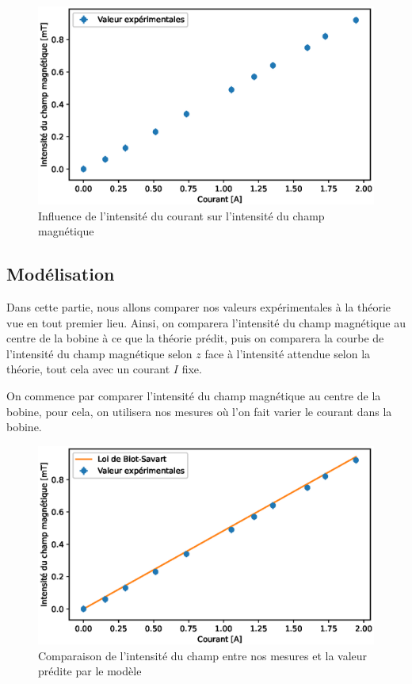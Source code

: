 \documentclass[12pt]{article}
\begin{document}
\begin{figure}[h!]
    \begin{center}
        \includegraphics[scale=0.6]{img/MagnEnFonctionDeI.eps}
    \end{center}
    \caption{Influence de l'intensité du courant sur l'intensité du champ magnétique}
\end{figure}

\newpage

\subsection{Modélisation}
Dans cette partie, nous allons comparer nos valeurs expérimentales à la théorie vue en tout premier lieu. Ainsi,
on comparera l'intensité du champ magnétique au centre de la bobine à ce que la théorie prédit, puis on comparera la courbe
de l'intensité du champ magnétique selon $z$ face à l'intensité attendue selon la théorie, tout cela avec un courant $I$ fixe.

On commence par comparer l'intensité du champ magnétique au centre de la bobine, pour cela, on utilisera nos mesures où l'on fait varier le courant dans la bobine.

\begin{figure}[h!]
    \begin{center}
        \includegraphics[scale=0.6]{img/ComparaisonBO.eps}
    \end{center}
    \caption{Comparaison de l'intensité du champ entre nos mesures et la valeur prédite par le modèle}
\end{figure}
\end{document}
